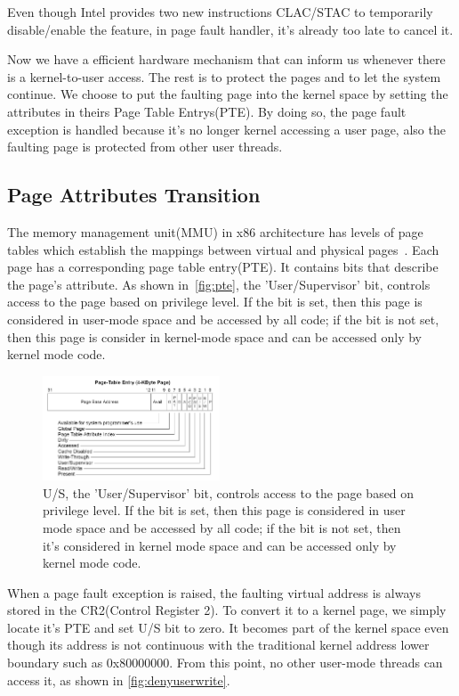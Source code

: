 Even though Intel provides two new instructions CLAC/STAC to temporarily disable/enable the feature, in page fault handler, it's already too late to cancel it.

Now we have a efficient hardware mechanism that can inform us whenever there is a kernel-to-user access. The rest is to protect the pages and to let the system continue. We choose to put the faulting page into the kernel space by setting the attributes in theirs Page Table Entrys(PTE). By doing so, the page fault exception is handled because it's no longer kernel accessing a user page, also the faulting page is protected from other user threads. 

\subsection{Page Attributes Transition} %


The memory management unit(MMU) in x86 architecture has levels of page tables which establish the mappings between virtual and physical pages~\cite{intelpaging}. Each page has a corresponding page table entry(PTE). It contains bits that describe the page's attribute. As shown in~\autoref{fig:pte}, the 'User/Supervisor' bit, controls access to the page based on privilege level. If the bit is set, then this page is considered in user-mode space and be accessed by all code; if the bit is not set, then this page is consider in kernel-mode space and can be accessed only by kernel mode code.


\begin{figure}[th]
  \includegraphics[width=0.47\textwidth]{figures/pte}
  \centering
  \caption{U/S, the 'User/Supervisor' bit, controls access to the page based on privilege level. If the bit is set, then this page is considered in user mode space and be accessed by all code; if the bit is not set, then it's considered in kernel mode space and can be accessed only by kernel mode code. }
  \label{fig:pte}
\end{figure}


When a page fault exception is raised, the faulting virtual address is always stored in the CR2(Control Register 2). To convert it to a kernel page, we simply locate it's PTE and set U/S bit to zero. It becomes part of the kernel space even though its address is not continuous with the traditional kernel address lower boundary such as 0x80000000. From this point, no other user-mode threads can access it, as shown in \autoref{fig:denyuserwrite}.

